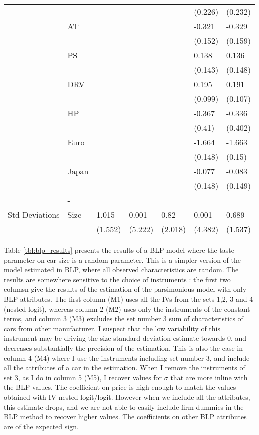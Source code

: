 \documentclass{article}\usepackage[]{graphicx}\usepackage[]{color}
\begin{document}
\begin{table}[ht]
\begin{tabular}{lllllll}
   &  &  &  &  & (0.226) & (0.232) \\ 
   & AT &  &  &  & -0.321 & -0.329 \\ 
   &  &  &  &  & (0.152) & (0.159) \\ 
   & PS &  &  &  & 0.138 & 0.136 \\ 
   &  &  &  &  & (0.143) & (0.148) \\ 
   & DRV &  &  &  & 0.195 & 0.191 \\ 
   &  &  &  &  & (0.099) & (0.107) \\ 
   & HP &  &  &  & -0.367 & -0.336 \\ 
   &  &  &  &  & (0.41) & (0.402) \\ 
   & Euro &  &  &  & -1.664 & -1.663 \\ 
   &  &  &  &  & (0.148) & (0.15) \\ 
   & Japan &  &  &  & -0.077 & -0.083 \\ 
   &  &  &  &  & (0.148) & (0.149) \\ 
   &  -  &  &  &  &  &  \\ 
  Std Deviations & Size & 1.015 & 0.001 & 0.82 & 0.001 & 0.689 \\ 
   &  & (1.552) & (5.222) & (2.018) & (4.382) & (1.537) \\ 
   \bottomrule 
\end{tabular}
\endgroup
\end{table}

%

Table \ref{tbl:blp_results} presents the results of a BLP model where the taste parameter on car size is a random parameter. This is a simpler version of the model estimated in BLP, where all observed characteristics are random. The results are somewhere sensitive to the choice of instruments : the first two columsn give the results of the estimation of the parsimonious model with only BLP attributes. The first column (M1) uses all the IVs from the sets 1,2, 3 and 4 (nested logit), whereas column 2 (M2) uses only the instruments of the constant terms, and column 3 (M3) excludes the set number 3 sum of characteristics of cars from other manufacturer. I suspect that the low variability of this instrument may be driving the size standard deviation estimate towards 0, and decreases substantially the precision of the estimation. This is also the case in column 4 (M4) where I use the instruments including set number 3, and include all the attributes of a car in the estimation. When I remove the instruments of set 3, as I do in column 5 (M5), I recover values for $\sigma$ that are more inline with the BLP values. The coefficient on price is high enough to match the values obtained with IV nested logit/logit. However when we include all the attributes, this estimate drops, and we are not able to easily include firm dummies in the BLP method to recover higher values. The coefficients on other BLP attributes are of the expected sign.
\end{document}

